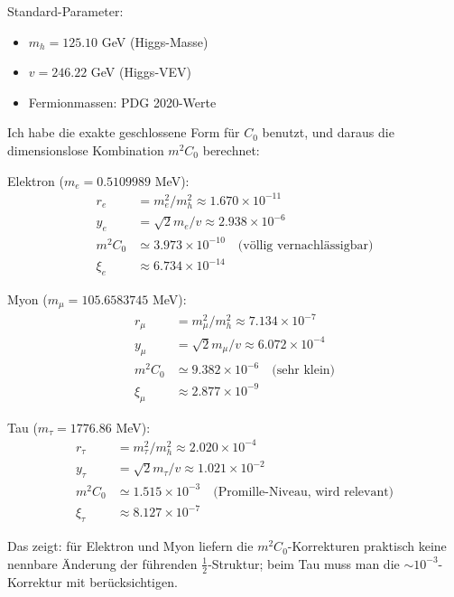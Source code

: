 	\begin{numerisch}
		Standard-Parameter:
		\begin{itemize}
			\item $m_h = 125.10$ GeV (Higgs-Masse)
			\item $v = 246.22$ GeV (Higgs-VEV)
			\item Fermionmassen: PDG 2020-Werte
		\end{itemize}
		
		Ich habe die exakte geschlossene Form für $C_0$ benutzt, und daraus die dimensionslose Kombination $m^2C_0$ berechnet:
		
		Elektron ($m_e = 0.5109989$ MeV):
		\begin{align}
			r_e &= m_e^2/m_h^2 \approx 1.670 \times 10^{-11}\\
			y_e &= \sqrt{2} m_e/v \approx 2.938 \times 10^{-6}\\
			m^2C_0 &\simeq 3.973 \times 10^{-10} \quad \text{(völlig vernachlässigbar)}\\
			\xi_e &\approx 6.734 \times 10^{-14}
		\end{align}
		
		Myon ($m_\mu = 105.6583745$ MeV):
		\begin{align}
			r_\mu &= m_\mu^2/m_h^2 \approx 7.134 \times 10^{-7}\\
			y_\mu &= \sqrt{2} m_\mu/v \approx 6.072 \times 10^{-4}\\
			m^2C_0 &\simeq 9.382 \times 10^{-6} \quad \text{(sehr klein)}\\
			\xi_\mu &\approx 2.877 \times 10^{-9}
		\end{align}
		
		Tau ($m_\tau = 1776.86$ MeV):
		\begin{align}
			r_\tau &= m_\tau^2/m_h^2 \approx 2.020 \times 10^{-4}\\
			y_\tau &= \sqrt{2} m_\tau/v \approx 1.021 \times 10^{-2}\\
			m^2C_0 &\simeq 1.515 \times 10^{-3} \quad \text{(Promille-Niveau, wird relevant)}\\
			\xi_\tau &\approx 8.127 \times 10^{-7}
		\end{align}
		
		Das zeigt: für Elektron und Myon liefern die $m^2C_0$-Korrekturen praktisch keine nennbare Änderung der führenden $\frac{1}{2}$-Struktur; beim Tau muss man die $\sim 10^{-3}$-Korrektur mit berücksichtigen.
	\end{numerisch}
